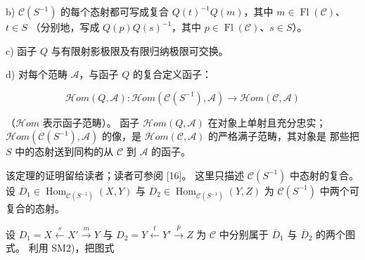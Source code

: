 \par\noindent b) $\mathcal C(S^{-1})$ 的每个态射都可写成复合
$Q(t)^{-1}Q(m)$，其中 $m\in\operatorname{Fl}(\mathcal C)$、$t\in S$
（分别地，写成 $Q(p)Q(s)^{-1}$，其中
$p\in\operatorname{Fl}(\mathcal C)$、$s\in S$）。

\par\noindent c) 函子 $Q$ 与有限射影极限及有限归纳极限可交换。

\par\noindent d) 对每个范畴 $\mathcal A$，与函子 $Q$ 的复合定义函子：

\[
  \mathcal{H}\!om(Q,\mathcal A)\colon
  \mathcal{H}\!om(\mathcal C(S^{-1}),\mathcal A)
  \longrightarrow \mathcal{H}\!om(\mathcal C,\mathcal A)
\]

\noindent\textup{（$\mathcal{H}\!om$ 表示函子范畴）。}
%
函子 $\mathcal{H}\!om(Q,\mathcal A)$ 在对象上单射且充分忠实；
$\mathcal{H}\!om(\mathcal C(S^{-1}),\mathcal A)$ 的像，是
$\mathcal{H}\!om(\mathcal C,\mathcal A)$ 的严格满子范畴，其对象是
那些把 $S$ 中的态射送到同构的从 $\mathcal C$ 到 $\mathcal A$ 的函子。
\par\endgroup

该定理的证明留给读者；读者可参阅 [16]。
%
这里只描述 $\mathcal C(S^{-1})$ 中态射的复合。设
$\overline D_1\in\operatorname{Hom}_{\mathcal C(S^{-1})}(X,Y)$ 与
$\overline D_2\in\operatorname{Hom}_{\mathcal C(S^{-1})}(Y,Z)$ 为
$\mathcal C(S^{-1})$ 中两个可复合的态射。

设 $D_1=X\xleftarrow{s}X'\xrightarrow{m}Y$ 与
$D_2=Y\xleftarrow{t}Y'\xrightarrow{p}Z$ 为 $\mathcal C$ 中分别属于
$\overline D_1$ 与 $\overline D_2$ 的两个图式。
%
利用 SM2)，把图式

\begin{center}
\end{center}

\endgroup
